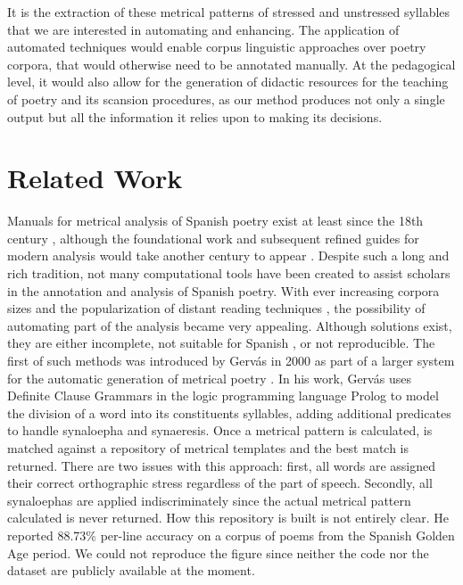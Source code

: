 \documentclass[a4paper,11pt,twocolumn,twoside]{article}
\begin{document}
It is the extraction of these metrical patterns of stressed and unstressed syllables that we are interested in automating and enhancing. The application of automated techniques would enable corpus linguistic approaches over poetry corpora, that would otherwise need to be annotated manually. At the pedagogical level, it would also allow for the generation of didactic resources for the teaching of poetry and its scansion procedures, as our method produces not only a single output but all the information it relies upon to making its decisions.

\section{Related Work}
Manuals for metrical analysis of Spanish poetry exist at least since the 18th century \cite{caparros1975contribucion}, although the foundational work and subsequent refined guides for modern analysis would take another century to appear \cite{bello1859principios,navarro1991metrica,caparros1993metrica}. Despite such a long and rich tradition, not many computational tools have been created to assist scholars in the annotation and analysis of Spanish poetry. With ever increasing corpora sizes and the popularization of distant reading techniques \cite{moretti2013distant,jockers2013macroanalysis}, the possibility of automating part of the analysis became very appealing. Although solutions exist, they are either incomplete, not suitable for Spanish \cite{hartman2005scandroid,agirrezabal2016zeuscansion}, or not reproducible. The first of such methods was introduced by Gervás in 2000 as part of a larger system for the automatic generation of metrical poetry \cite{gervas2000logic}. In his work, Gervás uses Definite Clause Grammars in the logic programming language Prolog to model the division of a word into its constituents syllables, adding additional predicates to handle synaloepha and synaeresis. Once a metrical pattern is calculated, is matched against a repository of metrical templates and the best match is returned. There are two issues with this approach: first, all words are assigned their correct orthographic stress regardless of the part of speech. Secondly, all synaloephas are applied indiscriminately since the actual metrical pattern calculated is never returned. How this repository is built is not entirely clear. He reported 88.73\% per-line accuracy on a corpus of poems from the Spanish Golden Age period. We could not reproduce the figure since neither the code nor the dataset are publicly available at the moment.
\end{document}
